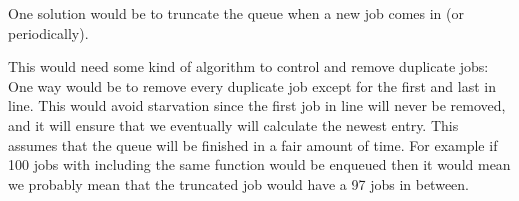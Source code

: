 
One solution would be to truncate the queue when a new job comes in (or periodically).

This would need some kind of algorithm to control and remove duplicate jobs:
One way would be to remove every duplicate job except for the first and last in line.
This would avoid starvation since the first job in line will never be removed, and
it will ensure that we eventually will calculate the newest entry. This assumes
that the queue will be finished in a fair amount of time. For example if 100
jobs with including the same function would be enqueued then it would mean we probably
mean that the truncated job would have a 97 jobs in between.





